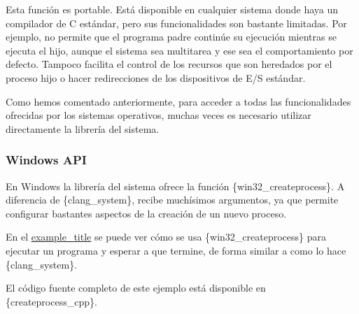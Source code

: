 Esta función es portable. Está disponible en cualquier sistema donde
haya un compilador de C estándar, pero sus funcionalidades son bastante
limitadas. Por ejemplo, no permite que el programa padre continúe su
ejecución mientras se ejecuta el hijo, aunque el sistema sea multitarea
y ese sea el comportamiento por defecto. Tampoco facilita el control de
los recursos que son heredados por el proceso hijo o hacer redirecciones
de los dispositivos de E/S estándar.

Como hemos comentado anteriormente, para acceder a todas las
funcionalidades ofrecidas por los sistemas operativos, muchas veces es
necesario utilizar directamente la librería del sistema.

\subsubsection{Windows API}\label{_windows_api}

En Windows la librería del sistema ofrece la función
\{win32\_createprocess\}. A diferencia de \{clang\_system\}, recibe
muchísimos argumentos, ya que permite configurar bastantes aspectos de
la creación de un nuevo proceso.

En el \hyperref[ejemplo-createprocess]{example\_title} se puede ver cómo
se usa \{win32\_createprocess\} para ejecutar un programa y esperar a
que termine, de forma similar a como lo hace \{clang\_system\}.

El código fuente completo de este ejemplo está disponible en
\{createprocess\_cpp\}.

